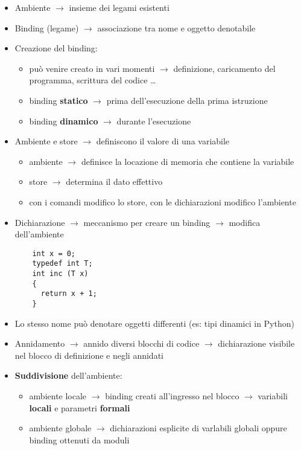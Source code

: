 \documentclass[12pt]{extarticle}
\begin{document}
\begin{itemize}
  \item Ambiente $\rightarrow$ insieme dei legami esistenti
  \item Binding (legame) $\rightarrow$ associazione tra nome e oggetto denotabile
  \item Creazione del binding:
  \begin{itemize}
    \item può venire creato in vari momenti $\rightarrow$ definizione, caricamento del programma, scrittura del codice \dots
    \item binding \textbf{statico} $\rightarrow$ prima dell'esecuzione della prima istruzione
    \item binding \textbf{dinamico} $\rightarrow$ durante l'esecuzione
  \end{itemize}
  \item Ambiente e store $\rightarrow$ definiscono il valore di una variabile
  \begin{itemize}
    \item ambiente $\rightarrow$ definisce la locazione di memoria che contiene la variabile
    \item store $\rightarrow$ determina il dato effettivo
    \item con i comandi modifico lo store, con le dichiarazioni modifico l'ambiente
  \end{itemize}
  \item Dichiarazione $\rightarrow$ meccanismo per creare un binding $\rightarrow$ modifica dell'ambiente
  \begin{lstlisting}
    int x = 0;
    typedef int T;
    int inc (T x) 
    {
      return x + 1;
    }
  \end{lstlisting}
  \item Lo stesso nome può denotare oggetti differenti (es: tipi dinamici in Python)
  \item Annidamento $\rightarrow$ annido diversi blocchi di codice $\rightarrow$ dichiarazione visibile nel blocco di definizione e negli annidati
  \item \textbf{Suddivisione} dell'ambiente:
  \begin{itemize}
    \item ambiente locale $\rightarrow$ binding creati all'ingresso nel blocco $\rightarrow$ variabili \textbf{locali} e parametri \textbf{formali}
    \item ambiente globale $\rightarrow$ dichiarazioni esplicite di varlabili globali oppure binding ottenuti da moduli
  \end{itemize} 


\end{itemize}
\end{document}
